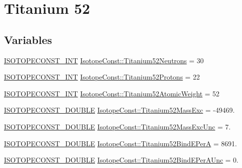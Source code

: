 \hypertarget{group___isotope_const-_titanium-_ti52}{}\section{Titanium 52}
\label{group___isotope_const-_titanium-_ti52}
\subsection*{Variables}
\begin{DoxyCompactItemize}
\item 
\mbox{\hyperlink{group___isotope_const-_macros_ga5f18360b3e99483a35c32d789e62621c}{I\+S\+O\+T\+O\+P\+E\+C\+O\+N\+S\+T\+\_\+\+I\+NT}} \mbox{\hyperlink{group___isotope_const-_titanium-_ti52_gafe653b543869d716d9855cdbb99eba44}{Isotope\+Const\+::\+Titanium52\+Neutrons}} = 30
\item 
\mbox{\hyperlink{group___isotope_const-_macros_ga5f18360b3e99483a35c32d789e62621c}{I\+S\+O\+T\+O\+P\+E\+C\+O\+N\+S\+T\+\_\+\+I\+NT}} \mbox{\hyperlink{group___isotope_const-_titanium-_ti52_gaa9cefde444cc14425424a920723ebf56}{Isotope\+Const\+::\+Titanium52\+Protons}} = 22
\item 
\mbox{\hyperlink{group___isotope_const-_macros_ga5f18360b3e99483a35c32d789e62621c}{I\+S\+O\+T\+O\+P\+E\+C\+O\+N\+S\+T\+\_\+\+I\+NT}} \mbox{\hyperlink{group___isotope_const-_titanium-_ti52_gabd680c1f155d603f811d54a40d03e7f5}{Isotope\+Const\+::\+Titanium52\+Atomic\+Weight}} = 52
\item 
\mbox{\hyperlink{group___isotope_const-_macros_ga8f45a7272ce02c0b4c65c44636ed719a}{I\+S\+O\+T\+O\+P\+E\+C\+O\+N\+S\+T\+\_\+\+D\+O\+U\+B\+LE}} \mbox{\hyperlink{group___isotope_const-_titanium-_ti52_gad12bb8a514d8633e8bcf864705cbef83}{Isotope\+Const\+::\+Titanium52\+Mass\+Exc}} = -\/49469.
\item 
\mbox{\hyperlink{group___isotope_const-_macros_ga8f45a7272ce02c0b4c65c44636ed719a}{I\+S\+O\+T\+O\+P\+E\+C\+O\+N\+S\+T\+\_\+\+D\+O\+U\+B\+LE}} \mbox{\hyperlink{group___isotope_const-_titanium-_ti52_ga4ad49ee9024bb890c9b716d88fa01e1a}{Isotope\+Const\+::\+Titanium52\+Mass\+Exc\+Unc}} = 7.
\item 
\mbox{\hyperlink{group___isotope_const-_macros_ga8f45a7272ce02c0b4c65c44636ed719a}{I\+S\+O\+T\+O\+P\+E\+C\+O\+N\+S\+T\+\_\+\+D\+O\+U\+B\+LE}} \mbox{\hyperlink{group___isotope_const-_titanium-_ti52_gacfd12424f065db7c476c31b0ab5de896}{Isotope\+Const\+::\+Titanium52\+Bind\+E\+PerA}} = 8691.
\item 
\mbox{\hyperlink{group___isotope_const-_macros_ga8f45a7272ce02c0b4c65c44636ed719a}{I\+S\+O\+T\+O\+P\+E\+C\+O\+N\+S\+T\+\_\+\+D\+O\+U\+B\+LE}} \mbox{\hyperlink{group___isotope_const-_titanium-_ti52_gadc872638e12eb2eca12e233dd2eb9012}{Isotope\+Const\+::\+Titanium52\+Bind\+E\+Per\+A\+Unc}} = 0.

\end{DoxyCompactItemize}
